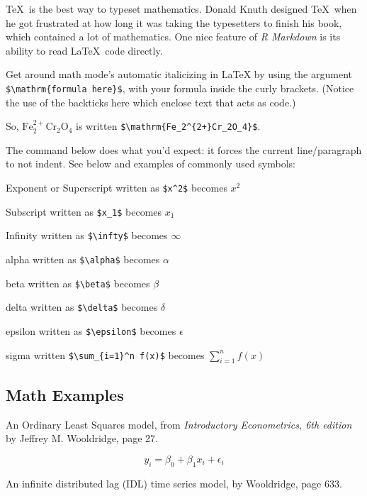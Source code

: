 \documentclass[12pt,oneside]{chicagocapstone}
\begin{document}
\TeX~is the best way to typeset mathematics. Donald Knuth designed \TeX~when he got frustrated at how long it was taking the typesetters to finish his book, which contained a lot of mathematics. One nice feature of \emph{R Markdown} is its ability to read \LaTeX~code directly.

Get around math mode's automatic italicizing in LaTeX by using the argument \texttt{\$\textbackslash{}mathrm\{formula\ here\}\$}, with your formula inside the curly brackets. (Notice the use of the backticks here which enclose text that acts as code.)

So, \(\mathrm{Fe_2^{2+}Cr_2O_4}\) is written \texttt{\$\textbackslash{}mathrm\{Fe\_2\^{}\{2+\}Cr\_2O\_4\}\$}.

The \noindent command below does what you'd expect: it forces the current line/paragraph to not indent. See below and examples of commonly used symbols:

\noindent Exponent or Superscript written as \texttt{\$x\^{}2\$} becomes \(x^2\)

\noindent Subscript written as \texttt{\$x\_1\$} becomes \(x_1\)

\noindent Infinity written as \texttt{\$\textbackslash{}infty\$} becomes \(\infty\)

\noindent alpha written as \texttt{\$\textbackslash{}alpha\$} becomes \(\alpha\)

\noindent beta written as \texttt{\$\textbackslash{}beta\$} becomes \(\beta\)

\noindent delta written as \texttt{\$\textbackslash{}delta\$} becomes \(\delta\)

\noindent epsilon written as \texttt{\$\textbackslash{}epsilon\$} becomes \(\epsilon\)

\noindent sigma written \texttt{\$\textbackslash{}sum\_\{i=1\}\^{}n\ f(x)\$} becomes \(\sum_{i=1}^n f(x)\)

\hypertarget{math-examples}{%
\subsection*{Math Examples}\label{math-examples}}

An Ordinary Least Squares model, from \emph{Introductory Econometrics, 6th edition} by Jeffrey M. Wooldridge, page 27.

\[y_i = \beta_0 + \beta_1 x_i + \epsilon_i\]

An infinite distributed lag (IDL) time series model, by Wooldridge, page 633.
\end{document}
